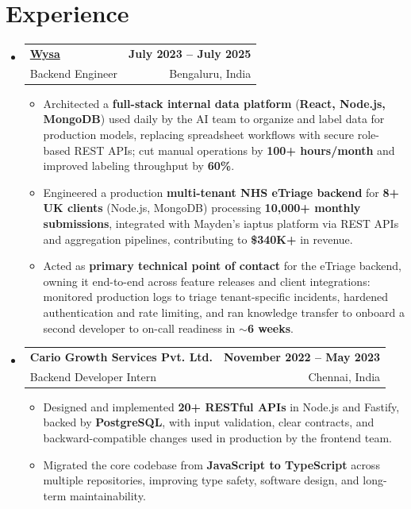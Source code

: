 \documentclass[letterpaper,10pt]{article}
\makeatletter
\newcommand{\resumeItem}[1]{
  \item\small{#1\vspace{-1pt}}
}
\newcommand{\resumeSubheading}[4]{
  \vspace{1pt}\item
    \begin{tabular*}{0.985\textwidth}[t]{l@{\extracolsep{\fill}}r}
      \textbf{#1} & \textbf{\small #2} \\
      {\small\color{ResumeSlate} #3} & {\small\color{ResumeSlate} #4} \\
    \end{tabular*}\vspace{-6pt}
}
\newcommand{\resumeSubHeadingListStart}{\begin{itemize}[leftmargin=0.0in, label={}, itemsep=2pt, topsep=2pt]}
\newcommand{\resumeSubHeadingListEnd}{\end{itemize}}
\newcommand{\resumeItemListStart}{\begin{itemize}[leftmargin=0.18in, itemsep=2pt, topsep=1pt]}
\newcommand{\resumeItemListEnd}{\end{itemize}\vspace{-4pt}}
\makeatother
\begin{document}
\section{Experience}
\resumeSubHeadingListStart
  \resumeSubheading
    {\href{https://www.wysa.io}{Wysa}}{July 2023 -- July 2025}
    {Backend Engineer}{Bengaluru, India}
    \resumeItemListStart
      \resumeItem{Architected a \textbf{full-stack internal data platform} (\textbf{React, Node.js, MongoDB}) used daily by the AI team to organize and label data for production models, replacing spreadsheet workflows with secure role-based REST APIs; cut manual operations by \textbf{100+ hours/month} and improved labeling throughput by \textbf{60\%}.}
      \resumeItem{Engineered a production \textbf{multi-tenant NHS eTriage backend} for \textbf{8+ UK clients} (Node.js, MongoDB) processing \textbf{10{,}000+ monthly submissions}, integrated with Mayden's iaptus platform via REST APIs and aggregation pipelines, contributing to \textbf{\$340K+} in revenue.}
      \resumeItem{Acted as \textbf{primary technical point of contact} for the eTriage backend, owning it end-to-end across feature releases and client integrations: monitored production logs to triage tenant-specific incidents, hardened authentication and rate limiting, and ran knowledge transfer to onboard a second developer to on-call readiness in \textbf{$\sim$6 weeks}.}
    \resumeItemListEnd
  \resumeSubheading
    {Cario Growth Services Pvt. Ltd.}{November 2022 -- May 2023}
    {Backend Developer Intern}{Chennai, India}
    \resumeItemListStart
      \resumeItem{Designed and implemented \textbf{20+ RESTful APIs} in Node.js and Fastify, backed by \textbf{PostgreSQL}, with input validation, clear contracts, and backward-compatible changes used in production by the frontend team.}
      \resumeItem{Migrated the core codebase from \textbf{JavaScript to TypeScript} across multiple repositories, improving type safety, software design, and long-term maintainability.}
    \resumeItemListEnd
\resumeSubHeadingListEnd
\vspace{-4pt}
\end{document}
